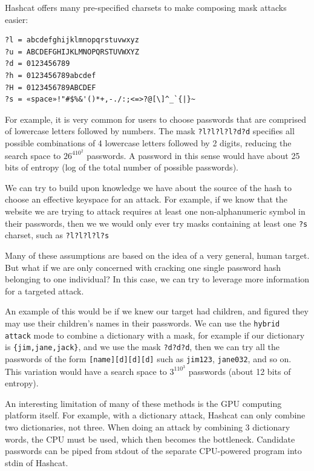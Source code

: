 \documentclass[acmlarge]{acmart}
\begin{document}
Hashcat offers many pre-specified charsets to make composing mask attacks easier:

\begin{center}
\begin{minipage}{8cm}
\begin{verbatim}
?l = abcdefghijklmnopqrstuvwxyz
?u = ABCDEFGHIJKLMNOPQRSTUVWXYZ
?d = 0123456789
?h = 0123456789abcdef
?H = 0123456789ABCDEF
?s = «space»!"#$%&'()*+,-./:;<=>?@[\]^_`{|}~
\end{verbatim}
\end{minipage}
\end{center}

For example, it is very common for users to choose passwords that are comprised of lowercase letters followed by numbers. The mask \texttt{?l?l?l?l?d?d} specifies all possible combinations of 4 lowercase letters followed by 2 digits, reducing the search space to $26^410^2$ passwords. A password in this sense would have about 25 bits of entropy (log of the total number of possible passwords).

We can try to build upon knowledge we have about the source of the hash to choose an effective keyspace for an attack. For example, if we know that the website we are trying to attack requires at least one non-alphanumeric symbol in their passwords, then we we would only ever try masks containing at least one \texttt{?s} charset, such as \texttt{?l?l?l?l?s}

Many of these assumptions are based on the idea of a very general, human target. But what if we are only concerned with cracking one single password hash belonging to one individual? In this case, we can try to leverage more information for a targeted attack.

An example of this would be if we knew our target had children, and figured they may use their children's names in their passwords. We can use the \texttt{hybrid attack} mode to combine a dictionary with a mask, for example if our dictionary is \verb|{jim,jane,jack}|, and we use the mask \texttt{?d?d?d}, then we can try all the passwords of the form \texttt{[name][d][d][d]} such as \texttt{jim123}, \texttt{jane032}, and so on. This variation would have a search space to $3^110^3$ passwords (about 12 bits of entropy).

An interesting limitation of many of these methods is the GPU computing platform itself. For example, with a dictionary attack, Hashcat can only combine two dictionaries, not three. When doing an attack by combining 3 dictionary words, the CPU must be used, which then becomes the bottleneck. Candidate passwords can be piped from stdout of the separate CPU-powered program into stdin of Hashcat.
\end{document}
